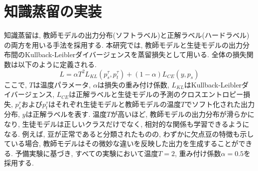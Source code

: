 \section{知識蒸留の実装}
知識蒸留は, 教師モデルの出力分布(ソフトラベル)と正解ラベル(ハードラベル)の両方を用いる手法を採用する.
本研究では, 教師モデルと生徒モデルの出力分布間のKullback-Leiblerダイバージェンスを蒸留損失として用いる.
全体の損失関数は以下のように定義される.
\begin{equation}
  L = \alpha T^2 L_{KL}(p^{\tau}_{s}, p^{\tau}_{t}) + (1 - \alpha) L_{CE}(y, p_{s})
\end{equation}
ここで, $T$は温度パラメータ, $\alpha$は損失の重み付け係数, $L_{KL}$はKullback-Leiblerダイバージェンス, $L_{CE}$は正解ラベルと生徒モデルの予測のクロスエントロピー損失, $p^{\tau}_{s}$および$p^{\tau}_{t}$はそれぞれ生徒モデルと教師モデルの温度$T$でソフト化された出力分布, $y$は正解ラベルを表す.
温度$T$が高いほど, 教師モデルの出力分布が滑らかになり, 生徒モデルは正しいクラスだけでなく, 相対的な関係も学習できるようになる. 
例えば, 豆が正常であると分類されたものの, わずかに欠点豆の特徴も示している場合, 教師モデルはその微妙な違いを反映した出力を生成することができる.
予備実験に基づき, すべての実験において温度$T=2$, 重み付け係数$\alpha=0.5$を採用する.
